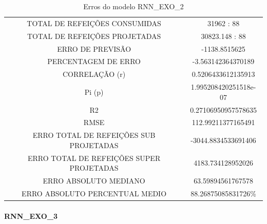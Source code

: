                 \begin{table}[!ht]
                \centering
                \caption{Erros do modelo  RNN\_EXO\_2 } 
                    \begin{tabular}{|c|c|}
                    \rowcolor{gray!50}
                    \hline
                \multicolumn{2}{c}{RNN\_EXO\_2:} \\ \hline
                TOTAL DE REFEIÇÕES CONSUMIDAS & 31962 : 88 \\
                TOTAL DE REFEIÇÕES PROJETADAS & 30823.148 : 88 \\
                ERRO DE PREVISÃO & -1138.8515625 \\
                PERCENTAGEM DE ERRO &  -3.563142364370189 \\
                CORRELAÇÃO (r)& 0.5206433612135913\\ Pi (p) & 1.995208420251518e-07\\
                R2 & 0.27106950957578635\\
                RMSE & 112.99211377165491\\
                ERRO TOTAL DE REFEIÇÕES SUB PROJETADAS & -3044.8834533691406\\
                ERRO TOTAL DE REFEIÇÕES SUPER PROJETADAS & 4183.734128952026\\
                ERRO ABSOLUTO MEDIANO & 63.59894561767578\\
                ERRO ABSOLUTO PERCENTUAL MEDIO & 88.26875085831726\% \\ \hline \end{tabular}\end{table}
                
              
              \paragraph{RNN\_EXO\_3}
                \begin{figure}[H]
                \end{figure}

